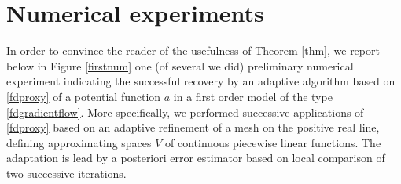\documentclass[A4paper,11pt]{article}
\theoremstyle{definition}
\begin{document}
\section{Numerical experiments}\label{sec:num}
In order to convince the reader of the usefulness of Theorem \ref{thm}, we report below in Figure \ref{firstnum} one (of several we did) preliminary numerical experiment  indicating the successful recovery by an adaptive algorithm based on \eqref{fdproxy} of a potential function $a$ in a first order model of the type \eqref{fdgradientflow}. More specifically, we performed successive applications of  \eqref{fdproxy} based on an adaptive refinement of a mesh on the positive real line, defining approximating spaces $V$ of continuous piecewise linear functions. The adaptation is lead by a posteriori error estimator based on local comparison of two successive iterations.
\end{document}

